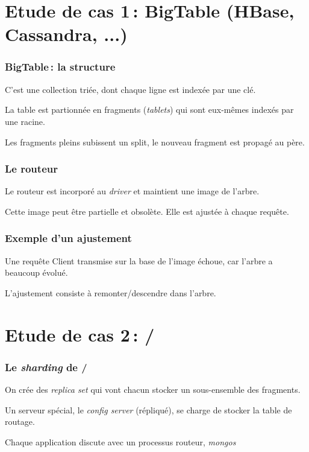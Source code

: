 \section{Etude de cas 1\,: BigTable (HBase, Cassandra, ...)}

\begin{frame}
\frametitle{BigTable\,: la structure} 

C'est une collection \alert{triée}, dont chaque ligne est indexée par une clé.


 
La table est partionnée en fragments (\textit{tablets}) qui sont eux-mêmes indexés 
par une racine. 

\vfill

Les fragments pleins subissent un \alert{split}, le nouveau fragment est propagé 
au père.


\end{frame}
 

\begin{frame}
\frametitle{Le routeur}

Le routeur est incorporé au \textit{driver} et maintient une \alert{image} de l'arbre.



Cette image peut être \alert{partielle} et \alert{obsolète}. Elle est \alert{ajustée}
à chaque requête.

\end{frame}
 
\begin{frame}
\frametitle{Exemple d'un ajustement}

Une requête Client transmise sur la base de l'image échoue, car l'arbre a 
beaucoup évolué.


L'ajustement consiste à remonter/descendre dans l'arbre.

\end{frame}

\section{Etude de cas 2\,: \mongodb/}

 
\begin{frame}
\frametitle{Le \textit{sharding} de \mongodb/}

On crée des \textit{replica set} qui vont chacun stocker un sous-ensemble des fragments.

\vfill

Un serveur spécial, le \textit{config server} (répliqué), se charge de stocker la table de routage.

\vfill

Chaque application discute avec un processus routeur, \textit{mongos} 

\vfill



\end{frame}




